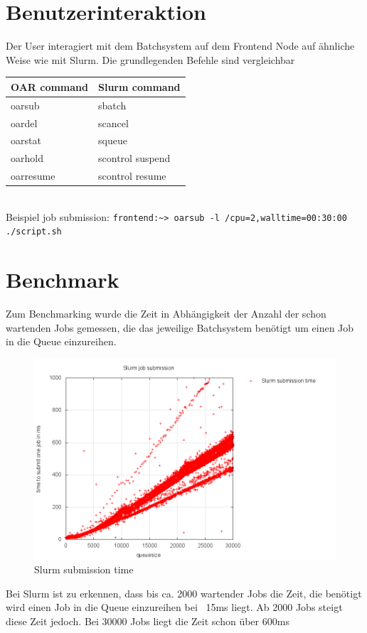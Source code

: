 \section{Benutzerinteraktion}
Der User interagiert mit dem Batchsystem auf dem Frontend Node auf ähnliche Weise wie mit Slurm. Die grundlegenden Befehle sind vergleichbar
            \begin{table}[h]
        \begin{tabular}{l|l}
          OAR command & Slurm command \\ \hline
        oarsub & sbatch  \\
        oardel  & scancel  \\
        oarstat & squeue  \\
        oarhold & scontrol suspend  \\
          oarresume & scontrol resume \\
    \end{tabular}
\end{table}\\
    Beispiel job submission: \lstinline{frontend:~> oarsub -l /cpu=2,walltime=00:30:00 ./script.sh}
	\newpage
\section{Benchmark}
	Zum Benchmarking wurde die Zeit in Abhängigkeit der Anzahl
    der schon wartenden Jobs gemessen,
    die das jeweilige Batchsystem benötigt um einen Job in die Queue einzureihen.\\
	\begin{figure}[H] \centering
		\includegraphics[scale=0.8]{../oar/output/pics/slurm.png} 
		\caption{Slurm submission time}
	\end{figure}
    Bei Slurm ist zu erkennen, dass bis ca. 2000 wartender Jobs die Zeit, die 
    benötigt wird einen Job in die Queue einzureihen bei ~15ms liegt. 
    Ab 2000 Jobs steigt diese Zeit jedoch. Bei 30000 Jobs liegt die Zeit schon
    über 600ms
	\newpage

